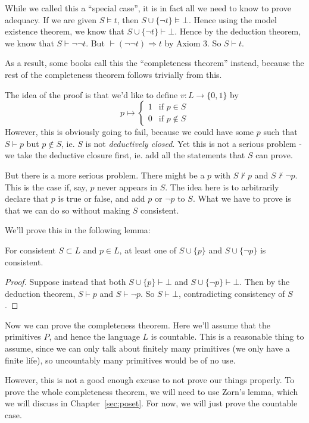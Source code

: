 \documentclass[a4paper]{article}
\begin{document}
While we called this a ``special case'', it is in fact all we need to know to prove adequacy. If we are given $S\models t$, then $S\cup \{\neg t\} \models \bot$. Hence using the model existence theorem, we know that $S\cup \{\neg t\} \vdash \bot$. Hence by the deduction theorem, we know that $S\vdash \neg \neg t$. But $\vdash (\neg\neg t)\Rightarrow t$ by Axiom 3. So $S\vdash t$.

As a result, some books call this the ``completeness theorem'' instead, because the rest of the completeness theorem follows trivially from this.

The idea of the proof is that we'd like to define $v: L \to \{0, 1\}$ by
\[
  p\mapsto
  \begin{cases}
    1 & \text{if } p\in S\\
    0 & \text{if } p\not\in S
  \end{cases}
\]
However, this is obviously going to fail, because we could have some $p$ such that $S\vdash p$ but $p\not\in S$, ie. $S$ is not \emph{deductively closed}. Yet this is not a serious problem - we take the deductive closure first, ie. add all the statements that $S$ can prove.

But there is a more serious problem. There might be a $p$ with $S\not\vdash p$ and $S\not\vdash \neg p$. This is the case if, say, $p$ never appears in $S$. The idea here is to arbitrarily declare that $p$ is true or false, and add $p$ or $\neg p$ to $S$. What we have to prove is that we can do so without making $S$ consistent.

We'll prove this in the following lemma:
\begin{lemma}
  For consistent $S\subset L$ and $p\in L$, at least one of $S\cup \{p\}$ and $S\cup \{\neg p\}$ is consistent.
\end{lemma}

\begin{proof}
  Suppose instead that both $S\cup \{p\} \vdash \bot$ and $S\cup \{\neg p\}\vdash \bot$. Then by the deduction theorem, $S\vdash p$ and $S\vdash \neg p$. So $S\vdash \bot$, contradicting consistency of $S$.
\end{proof}

Now we can prove the completeness theorem. Here we'll assume that the primitives $P$, and hence the language $L$ is countable. This is a reasonable thing to assume, since we can only talk about finitely many primitives (we only have a finite life), so uncountably many primitives would be of no use.

However, this is not a good enough excuse to not prove our things properly. To prove the whole completeness theorem, we will need to use Zorn's lemma, which we will discuss in Chapter~\ref{sec:poset}. For now, we will just prove the countable case.
\end{document}
